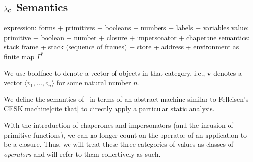 \documentclass{sigplanconf}
\begin{document}
\newcommand{\bind}[4]{\mathrm{bind}(#1,#2,#3,#4)}
\newcommand{\prebind}[2]{\mathrm{pre\mhyphen bind}(#1,#2)}
\newcommand{\recbind}[4]{\mathrm{rec\mhyphen bind}(#1,#2,#3,#4)}

\newcommand{\clo}[2]{(#1,#2)}
\newcommand{\cha}[2]{\mathrm{chaperone}(\ell,#1,#2)}
\newcommand{\imp}[2]{\mathrm{impersonator}(#1,#2)}

\newcommand{\chak}[1]{\mathrm{chap}_\kappa(\ell,#1)}
\newcommand{\chacwk}[2]{\mathrm{chap\mhyphen neg\mhyphen ults}_\kappa(\ell,#1,#2)}
\newcommand{\chacfk}[1]{\mathrm{chap\mhyphen fun\mhyphen ults}_\kappa(\ell,#1)}
\newcommand{\chacrk}[1]{\mathrm{chap\mhyphen pos\mhyphen ults}_\kappa(\ell,#1)}

\newcommand{\impk}[1]{\mathrm{imp}_\kappa(\ell,#1)}
\newcommand{\impcwk}[2]{\mathrm{imp\mhyphen neg\mhyphen ults}_\kappa(\ell,#1,#2)}
\newcommand{\impcfk}[1]{\mathrm{imp\mhyphen fun\mhyphen ults}_\kappa(\ell,#1)}
\newcommand{\impcrk}[1]{\mathrm{imp\mhyphen pos\mhyphen ults}_\kappa(\ell,#1)}


\newcommand{\letk}[3]{\mathrm{let}_\kappa(#1,#2,#3)}
\newcommand{\letreck}[3]{\mathrm{letrec}_\kappa(#1,#2,#3)}


\newcommand{\rr}{\longrightarrow}
\newcommand{\rrs}{\longrightarrow^{*}}

\subsection{$\lambda_{\mathcal{C}}$ Semantics}

expression: forms + primitives + booleans + numbers + labels + variables
value: primitive + boolean + number + closure + impersonator + chaperone
semantics: stack frame + stack (sequence of frames) + store + address + environment as finite map
$\Gamma^{*}$

We use boldface to denote a vector of objects in that category, i.e., $\mathbf{v}$ denotes a vector $\langle v_1,\dots,v_n\rangle$ for some natural number $n$.

We define the semantics of \chapcalc\ in terms of an abstract machine similar to Felleisen's CESK machine[cite that] to directly apply a particular static analysis.

With the introduction of chaperones and impersonators (and the incusion of primitive functions), we can no longer count on the operator of an application to be a closure.
Thus, we will treat these three categories of values as classes of \emph{operators} and will refer to them collectively as such.
\end{document}
